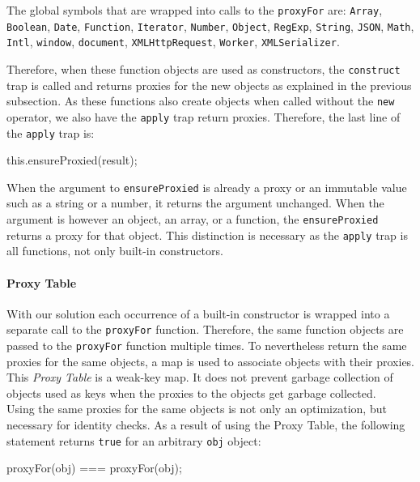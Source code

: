 The global symbols that are wrapped into calls to the \lstinline{proxyFor} are: \lstinline{Array}, \lstinline{Boolean}, \lstinline{Date}, \lstinline{Function}, \lstinline{Iterator}, \lstinline{Number}, \lstinline{Object}, \lstinline{RegExp}, \lstinline{String}, \lstinline{JSON}, \lstinline{Math}, \lstinline{Intl}, \lstinline{window}, \lstinline{document}, \lstinline{XMLHttpRequest}, \lstinline{Worker}, \lstinline{XMLSerializer}.

Therefore, when these function objects are used as constructors, the \lstinline{construct} trap is called and returns proxies for the new objects as explained in the previous subsection.
As these functions also create objects when called without the \lstinline{new} operator, we also have the \lstinline{apply} trap return proxies.
Therefore, the last line of the \lstinline{apply} trap is:

\begin{code}{}{}
this.ensureProxied(result);
\end{code}
\iffalse
\end{verbatim}\fi

When the argument to \lstinline{ensureProxied} is already a proxy or an immutable value such as a string or a number, it returns the argument unchanged.
When the argument is however an object, an array, or a function, the \lstinline{ensureProxied} returns a proxy for that object.
This distinction is necessary as the \lstinline{apply} trap is all functions, not only built-in constructors.


\paragraph{Proxy Table}
With our solution each occurrence of a built-in constructor is wrapped into a separate call to the \lstinline{proxyFor} function.
Therefore, the same function objects are passed to the \lstinline{proxyFor} function multiple times.
To nevertheless return the same proxies for the same objects, a map is used to associate objects with their proxies.
This \emph{Proxy Table} is a weak-key map.
It does not prevent garbage collection of objects used as keys when the proxies to the objects get garbage collected.\\
Using the same proxies for the same objects is not only an optimization, but necessary for identity checks.
As a result of using the Proxy Table, the following statement returns \lstinline{true} for an arbitrary \lstinline{obj} object:

\begin{code}{}{}
proxyFor(obj) === proxyFor(obj);
\end{code}
\iffalse
\end{verbatim}\fi



